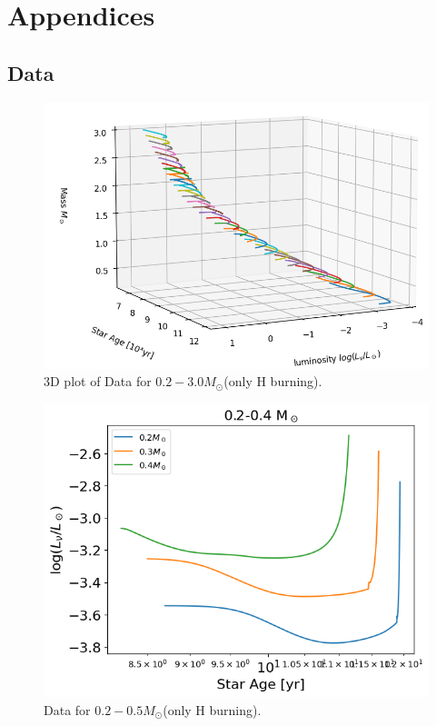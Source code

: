 \section{Appendices}

\subsection{Data}

\begin{figure}[H]
	\centering
	\includegraphics[width=\textwidth]{assets/3dpltdata.png}
	\caption{3D plot of Data for $0.2-3.0M_\odot$(only H burning).}
	\label{fig:3dplt}
\end{figure}
\begin{figure}[H]
	\centering
	\includegraphics[width=\textwidth]{assets/Data0.2-0.4.png}
	\caption{Data for $0.2-0.5M_\odot$(only H burning).}
	\label{fig:0.2-0.4}
\end{figure}
